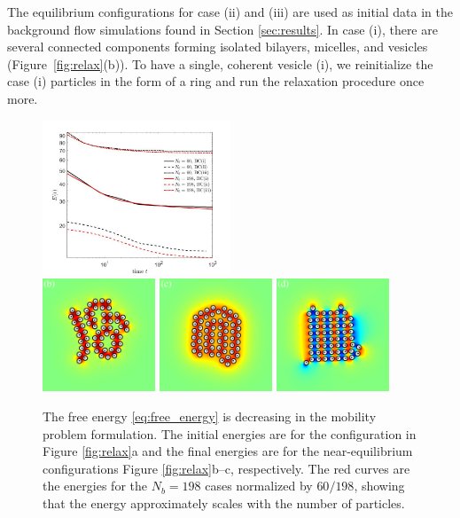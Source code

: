 \documentclass[aps,prl,preprint,groupedaddress]{revtex4-2}
\begin{document}
The equilibrium configurations for case (ii) and (iii) are used as initial data in the
background flow simulations found in Section \ref{sec:results}.
In case (i), there are several connected
components forming isolated bilayers, micelles, and vesicles (Figure~\ref{fig:relax}(b)).
To have a single, coherent vesicle (i), we reinitialize
the case (i) particles in the form of a ring and run the relaxation procedure once more.
\begin{figure}
  \begin{center}
  \includegraphics[width=0.5\textwidth]{Relax_Energy.jpg}\\
  \includegraphics[width=0.3\textwidth]{Nb60b.pdf}
  \includegraphics[width=0.3\textwidth]{Nb60c.pdf}
  \includegraphics[width=0.3\textwidth]{Nb60d.pdf}
  \end{center}
  \vspace{-20pt}  
  \caption{\label{fig:relax_energy}
    The free energy \eqref{eq:free_energy} is decreasing
    in the mobility problem formulation.  The initial energies
    are for the configuration in Figure \ref{fig:relax}a
    and the final energies are for the near-equilibrium
    configurations Figure \ref{fig:relax}b--c, respectively. 
    The red curves are the energies for the $N_b = 198$ cases normalized
    by $60/198$, showing that the energy approximately scales with the number of
    particles.
  }
\end{figure}
\end{document}
